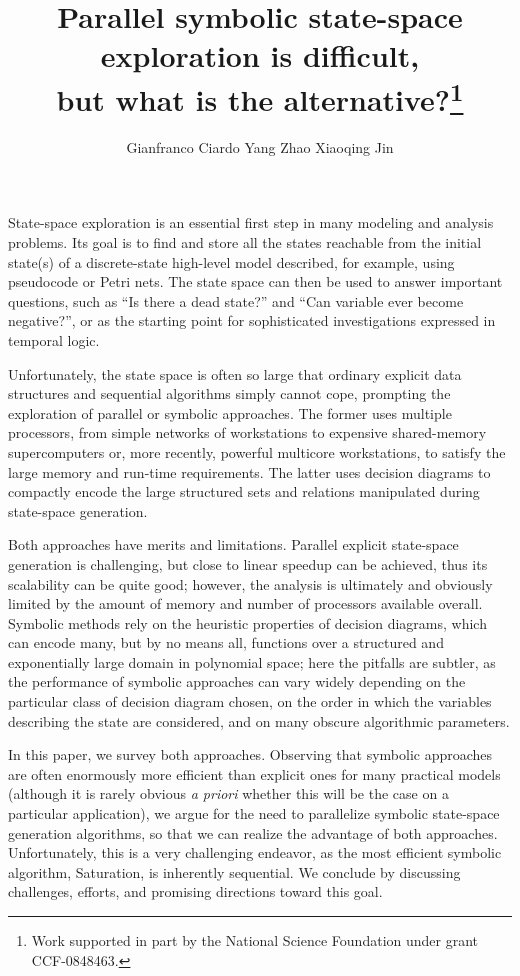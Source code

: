 \documentclass[copyright,creativecommons]{eptcs}
\title{
Parallel symbolic state-space exploration is difficult,\\
but what is the alternative?\thanks{
Work supported in part by the National Science Foundation under
grant CCF-0848463.}
}
\author{
Gianfranco Ciardo
\quad \quad
Yang Zhao
\quad \quad
Xiaoqing Jin
\institute{Department of Computer Science and Engineering\\
           University of California, Riverside}
\email{\{ciardo,zhaoy,jinx\}@cs.ucr.edu}
}
\date{}
\begin{document}
\maketitle

State-space exploration is an essential first step in many modeling and
analysis problems.
Its goal is to find and store all the states reachable from the initial
state(s) of a discrete-state high-level model described, for example,
using pseudocode or Petri nets.
The state space can then be used to answer
important questions, such as ``Is there a dead state?'' and
``Can variable  ever become negative?'', or as the starting point for
sophisticated investigations expressed in temporal logic.

Unfortunately, the state space is often so large that ordinary explicit
data structures and sequential algorithms simply cannot cope, prompting the
exploration of parallel or symbolic approaches.
The former uses multiple processors, from simple
networks of workstations to expensive shared-memory supercomputers or,
more recently, powerful multicore workstations, to satisfy the large
memory and run-time requirements.
The latter uses decision diagrams to compactly encode the large structured
sets and relations manipulated during state-space generation.

Both approaches have merits and limitations.
Parallel explicit state-space generation is challenging, but close
to linear speedup can be achieved, thus its scalability can be quite good;
however, the analysis is ultimately and obviously limited by the amount of
memory and number of processors available overall.
Symbolic methods rely on the heuristic properties of decision diagrams,
which can encode many, but by no means all, functions over a structured and
exponentially large domain in polynomial space;
here the pitfalls are subtler, as the performance of symbolic approaches
can vary widely depending on the particular class of decision diagram chosen,
on the order in which the variables describing the state are considered, and on
many obscure algorithmic parameters.

In this paper, we survey both approaches.
Observing that symbolic approaches
are often enormously more efficient than explicit ones
for many practical models (although it is rarely obvious \emph{a priori}
whether this will be the case on a particular application),
we argue for the need to parallelize symbolic state-space generation
algorithms, so that we can realize the advantage of both approaches.
Unfortunately, this is a very challenging endeavor, as the most
efficient symbolic algorithm, Saturation, is inherently sequential.
We conclude by discussing challenges, efforts, and promising directions
toward this goal.
\end{document}
